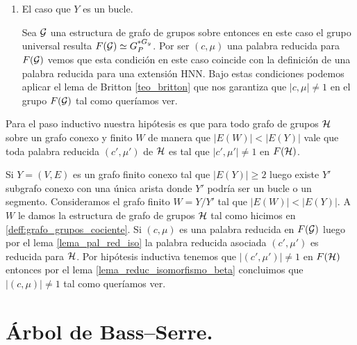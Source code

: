 \documentclass[tesis.tex]{subfiles}
\begin{document}
\begin{enumerate}
			\item El caso que $Y$ es un bucle.
				\begin{center}
				\end{center}
		Sea ${\cal G}$ una estructura de grafo de grupos sobre entonces en este caso el grupo universal resulta $F({\cal G}) \simeq G_P^{\ast G_y}$.
		Por ser $(c, \mu)$ una palabra reducida para $F({\cal G})$ vemos que esta condición en este caso coincide con la definición de una palabra reducida para una extensión HNN.		
		Bajo estas condiciones podemos aplicar el lema de Britton \ref{teo_britton} que nos garantiza que $|c, \mu| \neq 1$ en el grupo $F({\cal G})$ tal como queríamos ver.
\end{enumerate}
		
		
	
		Para el paso inductivo nuestra hipótesis es que para todo grafo de grupos ${\cal H}$ sobre un grafo conexo y finito $W$ de manera que $|E(W)| < |E(Y)|$ vale que 
		toda palabra reducida $(c',\mu')$ de ${\cal H}$ es tal que $|c',\mu'| \neq 1$ en $F({\cal H})$.

		Si $Y = (V,E)$ es un grafo finito conexo tal que $|E(Y)| \ge 2$ luego existe $Y'$ subgrafo conexo con una única arista donde $Y'$ podría ser un bucle o un segmento.
		Consideramos el grafo finito $W=Y/Y'$ tal que $|E(W)| < |E(Y)|$.
		A $W$ le damos la estructura de grafo de grupos ${\cal H}$ tal como hicimos en \ref{deff:grafo_grupos_cociente}.
		Si $(c, \mu)$ es una palabra reducida en $F({\cal G})$ luego por el lema \ref{lema_pal_red_iso} la palabra reducida asociada $(c',\mu')$ es reducida para ${\cal H}$.
		Por hipótesis inductiva tenemos que $|(c',\mu')| \neq 1$ en $F({\cal H})$ entonces por el lema \ref{lema_reduc_isomorfismo_beta} concluimos que $|(c,\mu)| \neq 1$ tal como queríamos ver.
	


\section{Árbol de Bass--Serre.}\label{secc_arb_BS}
\end{document}

